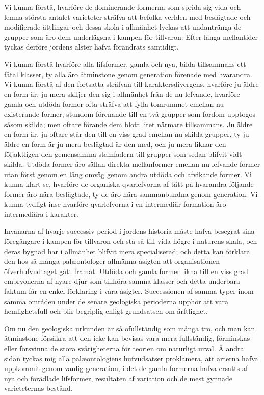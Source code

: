 Vi kunna förstå, hvarföre de dominerande formerna som sprida sig vida och lemna största antalet varieteter sträfva att befolka verlden med beslägtade och modifierade ättlingar och dessa skola i allmänhet lyckas att undantränga de grupper som äro dem underlägsna i kampen för tillvaron. Efter långa mellantider tyckas derföre jordens alster hafva förändrats samtidigt.

Vi kunna förstå hvarföre alla lifsformer, gamla och nya, bilda tillsammans ett fåtal klasser, ty alla äro åtminstone genom generation förenade med hvarandra. Vi kunna förstå af den fortsatta sträfvan till karaktersdivergens, hvarföre ju äldre en form är, ju mera skiljer den sig i allmänhet från de nu lefvande, hvarföre gamla och utdöda former ofta sträfva att fylla tomrummet emellan nu existerande former, stundom förenande till en två grupper som fordom upptogos såsom skilda; men oftare förande dem blott litet närmare tillsammans. Ju äldre en form är, ju oftare står den till en viss grad emellan nu skilda grupper, ty ju äldre en form är ju mera beslägtad är den med, och ju mera liknar den följaktligen den gemensamma stamfadern till grupper som sedan blifvit vidt skilda. Utdöda former äro sällan direkta mellanformer emellan nu lefvande former utan först genom en lång omväg genom andra utdöda och afvikande former. Vi kunna klart se, hvarföre de organiska qvarlefvorna af tätt på hvarandra följande former äro nära beslägtade, ty de äro nära sammanbundna genom generation. Vi kunna tydligt inse hvarföre qvarlefvorna i en intermediär formation äro intermediära i karakter.

Invånarna af hvarje successiv period i jordens historia måste hafva besegrat sina föregångare i kampen för tillvaron och stå så till vida högre i naturens skala, och deras bygnad har i allmänhet blifvit mera specialiserad; och detta kan förklara den hos så många palæontologer allmänna åsigten att organisationen öfverhufvudtaget gått framåt. Utdöda och gamla former likna till en viss grad embryonerna af nyare djur som tillhöra samma klasser och detta underbara faktum får en enkel förklaring i våra åsigter. Successionen af samma typer inom samma områden under de senare geologiska perioderna upphör att vara hemlighetsfull och blir begriplig enligt grundsatsen om ärftlighet.

Om nu den geologiska urkunden är så ofullständig som många tro, och man kan åtminstone försäkra att den icke kan bevisas vara mera fullständig, förminskas eller försvinna de stora svårigheterna för teorien om naturligt urval. Å andra sidan tyckas mig alla palæontologiens hufvudsatser proklamera, att arterna hafva uppkommit genom vanlig generation, i det de gamla formerna hafva ersatts af nya och förädlade lifsformer, resultaten af variation och de mest gynnade varieteternas bestånd.


